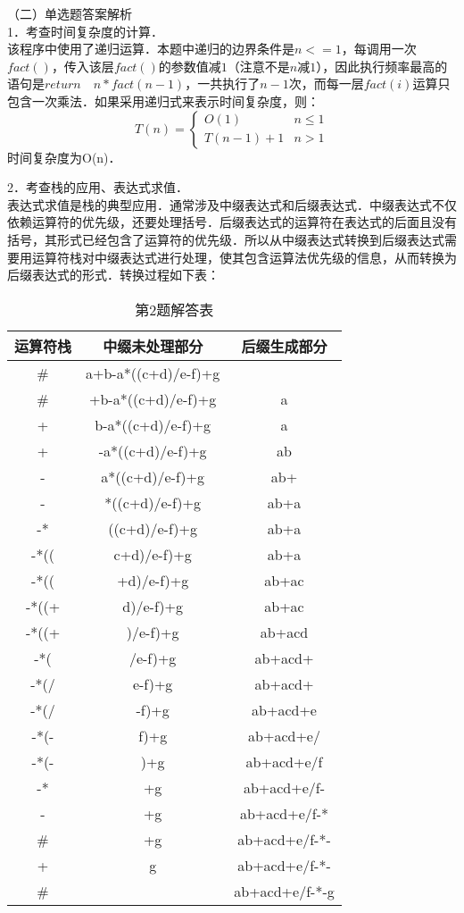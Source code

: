 （二）单选题答案解析\\
1．考查时间复杂度的计算．\\
该程序中使用了递归运算．本题中递归的边界条件是$n<=1$，每调用一次$fact()$，传入该层$fact()$的参数值减$1$（注意不是$n$减$1$），因此执行频率最高的语句是$return \quad n*fact(n-1)$，一共执行了$n-1$次，而每一层$fact(i)$运算只包含一次乘法．如果采用递归式来表示时间复杂度，则： \\
\begin{equation}
T(n)= 
\begin{cases}
O(1) & n \le 1\\
T(n-1)+1 & n>1
\end{cases}
\end{equation}
时间复杂度为O(n)．

2．考查栈的应用、表达式求值．\\
表达式求值是栈的典型应用．通常涉及中缀表达式和后缀表达式．中缀表达式不仅依赖运算符的优先级，还要处理括号．后缀表达式的运算符在表达式的后面且没有括号，其形式已经包含了运算符的优先级．所以从中缀表达式转换到后缀表达式需要用运算符栈对中缀表达式进行处理，使其包含运算法优先级的信息，从而转换为后缀表达式的形式．转换过程如下表： \\
\begin{table}[ht]
\centering
\caption{第2题解答表}\label{CSN12_tab4}
\begin{tabular}{|c|c|c|}
\hline
运算符栈 & 中缀未处理部分 & 后缀生成部分 \\
\hline
\# &a+b-a*((c+d)/e-f)+g & \\
\hline
\# &+b-a*((c+d)/e-f)+g &a \\
\hline
+ &b-a*((c+d)/e-f)+g &a \\
\hline
+ &-a*((c+d)/e-f)+g &ab \\
\hline
- &a*((c+d)/e-f)+g &ab+ \\
\hline
- &*((c+d)/e-f)+g &ab+a \\
\hline
-* &((c+d)/e-f)+g &ab+a \\
\hline
-*(( &c+d)/e-f)+g &ab+a \\
\hline
-*(( &+d)/e-f)+g &ab+ac \\
\hline
-*((+ &d)/e-f)+g &ab+ac \\
\hline
-*((+ &)/e-f)+g &ab+acd \\
\hline
-*( &/e-f)+g &ab+acd+ \\
\hline
-*(/ &e-f)+g &ab+acd+ \\
\hline
-*(/ &-f)+g &ab+acd+e \\
\hline
-*(- &f)+g &ab+acd+e/ \\
\hline
-*(- &)+g &ab+acd+e/f \\
\hline
-* &+g &ab+acd+e/f- \\
\hline
- &+g &ab+acd+e/f-* \\
\hline
\# &+g &ab+acd+e/f-*- \\
\hline
+ &g &ab+acd+e/f-*- \\
\hline
\# &&ab+acd+e/f-*-g \\
\hline
\end{tabular}
\end{table}

